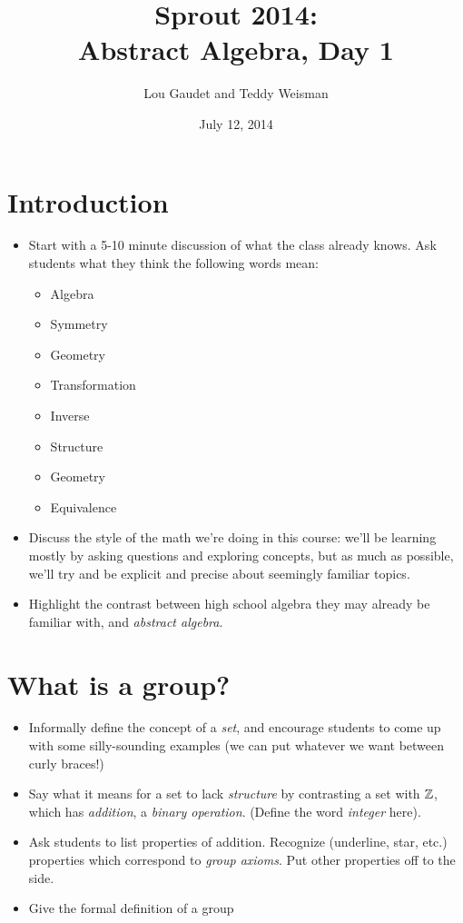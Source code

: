 \documentclass{article}
\title{Sprout 2014:\\
Abstract Algebra, Day 1}
\author{Lou Gaudet and Teddy Weisman}
\date{July 12, 2014}
\begin{document}
\maketitle

\section*{Introduction}

\begin{itemize}

\item Start with a 5-10 minute discussion of what the class already
  knows. Ask students what they think the following words mean:

  \begin{itemize}
  \item Algebra
  \item Symmetry
  \item Geometry
  \item Transformation
  \item Inverse
  \item Structure
  \item Geometry
  \item Equivalence
  \end{itemize}

\item Discuss the style of the math we're doing in this course: we'll
  be learning mostly by asking questions and exploring concepts, but
  as much as possible, we'll try and be explicit and precise about
  seemingly familiar topics.

\item Highlight the contrast between high school algebra they may
  already be familiar with, and \emph{abstract algebra}.

\end{itemize}

\section*{What is a group?}

\begin{itemize}
\item Informally define the concept of a \emph{set}, and encourage
  students to come up with some silly-sounding examples (we can put
  whatever we want between curly braces!)

\item Say what it means for a set to lack \emph{structure} by
  contrasting a set with $\mathbb{Z}$, which has \emph{addition}, a
  \emph{binary operation}. (Define the word \emph{integer} here). 

\item Ask students to list properties of addition. Recognize
  (underline, star, etc.) properties which correspond to \emph{group
    axioms}. Put other properties off to the side.

\item Give the formal definition of a group

\end{itemize}
\end{document}
